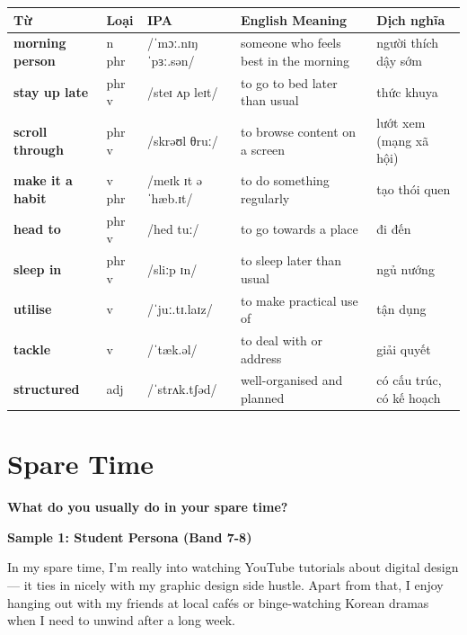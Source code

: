 \vspace{0.8em}
\begin{center}
\renewcommand{\arraystretch}{1.65}
\begin{tabularx}{\textwidth}{|V{0.22\textwidth}|C{0.07\textwidth}|I{0.20\textwidth}|Y|V{0.18\textwidth}|}
\hline
{}
\textbf{Từ} & \textbf{Loại} & \textbf{IPA} & \textbf{English Meaning} & \textbf{Dịch nghĩa} \\
\hline
\textbf{morning person} & n phr & /ˈmɔː.nɪŋ ˈpɜː.sən/ & someone who feels best in the morning & người thích dậy sớm \\ \hline
\textbf{stay up late} & phr v & /steɪ ʌp leɪt/ & to go to bed later than usual & thức khuya \\ \hline
\textbf{scroll through} & phr v & /skrəʊl θruː/ & to browse content on a screen & lướt xem (mạng xã hội) \\ \hline
\textbf{make it a habit} & v phr & /meɪk ɪt ə ˈhæb.ɪt/ & to do something regularly & tạo thói quen \\ \hline
\textbf{head to} & phr v & /hed tuː/ & to go towards a place & đi đến \\ \hline
\textbf{sleep in} & phr v & /sliːp ɪn/ & to sleep later than usual & ngủ nướng \\ \hline
\textbf{utilise} & v & /ˈjuː.tɪ.laɪz/ & to make practical use of & tận dụng \\ \hline
\textbf{tackle} & v & /ˈtæk.əl/ & to deal with or address & giải quyết \\ \hline
\textbf{structured} & adj & /ˈstrʌk.tʃəd/ & well-organised and planned & có cấu trúc, có kế hoạch \\ \hline
\end{tabularx}
\end{center}

\newpage

\section{Spare Time}
\begin{ieltsquestion}
\textbf{What do you usually do in your spare time?}
\end{ieltsquestion}
\textbf{Sample 1: Student Persona (Band 7-8)}

In my spare time, I'm really into watching YouTube tutorials about digital design — it ties in nicely with my graphic design side hustle. Apart from that, I enjoy hanging out with my friends at local cafés or binge-watching Korean dramas when I need to unwind after a long week.

